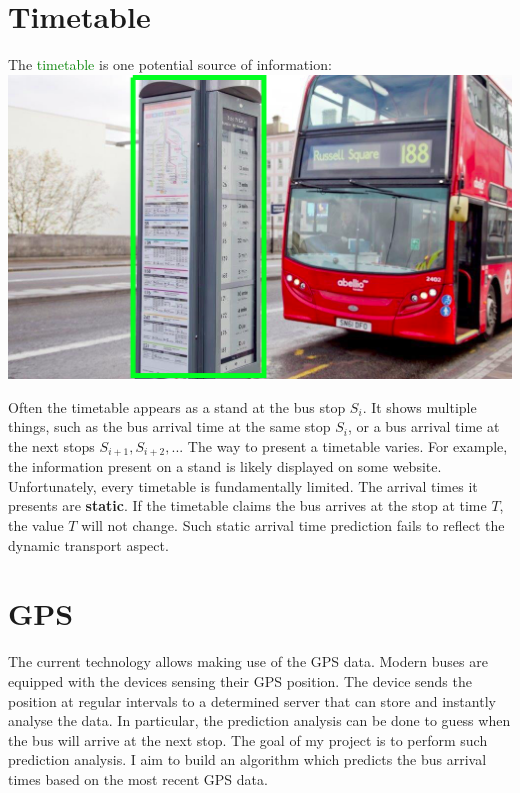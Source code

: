 \documentclass[12pt,a4paper,oneside,openright]{report}
\begin{document}
\section{Timetable}

The \textcolor{green}{timetable} is one potential source of information: \\

\includegraphics[width=\textwidth]{figs/timetable_uk.png}

Often the timetable appears as a stand at the bus stop $S_i$. It shows multiple
things, such as the bus arrival time at the same stop $S_i$, or a bus arrival time
at the next stops $S_{i+1}, S_{i+2}, ...$ The way to present a timetable varies.
For example, the information present on a stand is likely displayed on some website. \\

Unfortunately, every timetable is fundamentally limited. The arrival times it presents
are \textbf{static}. If the timetable claims the bus arrives at the stop at
time $T$, the value $T$ will not change. Such static arrival time prediction fails to
reflect the dynamic transport aspect. \\

\section{GPS}

The current technology allows making use of the GPS data. Modern buses are equipped
with the devices sensing their GPS position. The device sends the position at regular
intervals to a determined server that can store and instantly analyse the data. In
particular, the prediction analysis can be done to guess when the bus will arrive at
the next stop. The goal of my project is to perform such prediction analysis.
I aim to build an algorithm which predicts the bus arrival times based
on the most recent GPS data.
\end{document}
